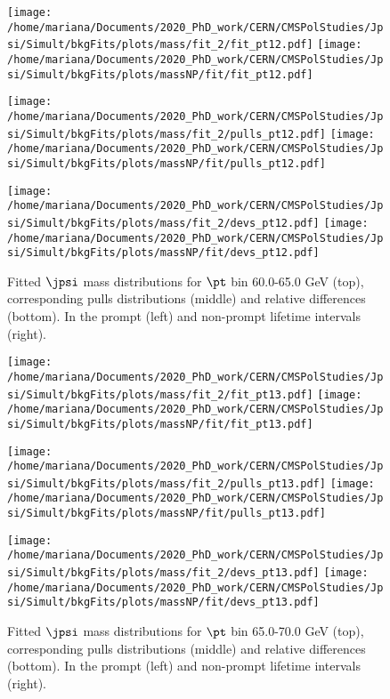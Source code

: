 \pagebreak

\begin{figure}[h!]
\centering
\texttt{[image: /home/mariana/Documents/2020\_PhD\_work/CERN/CMSPolStudies/Jpsi/Simult/bkgFits/plots/mass/fit\_2/fit\_pt12.pdf]}
\texttt{[image: /home/mariana/Documents/2020\_PhD\_work/CERN/CMSPolStudies/Jpsi/Simult/bkgFits/plots/massNP/fit/fit\_pt12.pdf]}

\texttt{[image: /home/mariana/Documents/2020\_PhD\_work/CERN/CMSPolStudies/Jpsi/Simult/bkgFits/plots/mass/fit\_2/pulls\_pt12.pdf]}
\texttt{[image: /home/mariana/Documents/2020\_PhD\_work/CERN/CMSPolStudies/Jpsi/Simult/bkgFits/plots/massNP/fit/pulls\_pt12.pdf]}

\texttt{[image: /home/mariana/Documents/2020\_PhD\_work/CERN/CMSPolStudies/Jpsi/Simult/bkgFits/plots/mass/fit\_2/devs\_pt12.pdf]}
\texttt{[image: /home/mariana/Documents/2020\_PhD\_work/CERN/CMSPolStudies/Jpsi/Simult/bkgFits/plots/massNP/fit/devs\_pt12.pdf]}
\caption{Fitted $\jpsi$ mass distributions for $\pt$ bin 60.0-65.0 GeV (top), corresponding pulls distributions (middle) and relative differences (bottom). In the prompt (left) and non-prompt lifetime intervals (right).}\label{f:m_fit_12}
\end{figure}

\pagebreak

\begin{figure}[h!]
\centering
\texttt{[image: /home/mariana/Documents/2020\_PhD\_work/CERN/CMSPolStudies/Jpsi/Simult/bkgFits/plots/mass/fit\_2/fit\_pt13.pdf]}
\texttt{[image: /home/mariana/Documents/2020\_PhD\_work/CERN/CMSPolStudies/Jpsi/Simult/bkgFits/plots/massNP/fit/fit\_pt13.pdf]}

\texttt{[image: /home/mariana/Documents/2020\_PhD\_work/CERN/CMSPolStudies/Jpsi/Simult/bkgFits/plots/mass/fit\_2/pulls\_pt13.pdf]}
\texttt{[image: /home/mariana/Documents/2020\_PhD\_work/CERN/CMSPolStudies/Jpsi/Simult/bkgFits/plots/massNP/fit/pulls\_pt13.pdf]}

\texttt{[image: /home/mariana/Documents/2020\_PhD\_work/CERN/CMSPolStudies/Jpsi/Simult/bkgFits/plots/mass/fit\_2/devs\_pt13.pdf]}
\texttt{[image: /home/mariana/Documents/2020\_PhD\_work/CERN/CMSPolStudies/Jpsi/Simult/bkgFits/plots/massNP/fit/devs\_pt13.pdf]}
\caption{Fitted $\jpsi$ mass distributions for $\pt$ bin 65.0-70.0 GeV (top), corresponding pulls distributions (middle) and relative differences (bottom). In the prompt (left) and non-prompt lifetime intervals (right).}\label{f:m_fit_13}
\end{figure}

